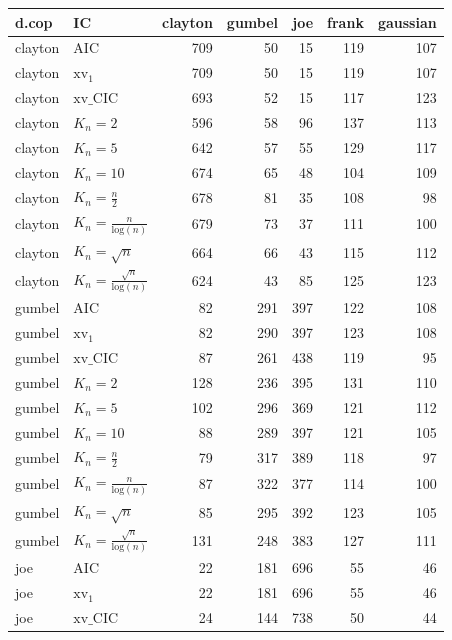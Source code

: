 \begin{table}[htbp]
\centering
\begin{tabular}{llrrrrr}
  \hline
d.cop & IC & clayton & gumbel & joe & frank & gaussian \\ 
  \hline
clayton & AIC & 709 & 50 & 15 & 119 & 107 \\ 
  clayton & $\text{xv}_{1}$ & 709 & 50 & 15 & 119 & 107 \\ 
  clayton & $\text{xv}\_\text{CIC}$ & 693 & 52 & 15 & 117 & 123 \\ 
  clayton & $K_{n}=2$ & 596 & 58 & 96 & 137 & 113 \\ 
  clayton & $K_{n}=5$ & 642 & 57 & 55 & 129 & 117 \\ 
  clayton & $K_{n}=10$ & 674 & 65 & 48 & 104 & 109 \\ 
  clayton & $K_{n}=\tfrac{n}{2}$ & 678 & 81 & 35 & 108 & 98 \\ 
  clayton & $K_{n}=\tfrac{n}{\text{log}(n)}$ & 679 & 73 & 37 & 111 & 100 \\ 
  clayton & $K_{n}=\sqrt{n}$ & 664 & 66 & 43 & 115 & 112 \\ 
  clayton & $K_{n}=\tfrac{\sqrt{n}}{\text{log}(n)}$ & 624 & 43 & 85 & 125 & 123 \\ 
   \hdashline
gumbel & AIC & 82 & 291 & 397 & 122 & 108 \\ 
  gumbel & $\text{xv}_{1}$ & 82 & 290 & 397 & 123 & 108 \\ 
  gumbel & $\text{xv}\_\text{CIC}$ & 87 & 261 & 438 & 119 & 95 \\ 
  gumbel & $K_{n}=2$ & 128 & 236 & 395 & 131 & 110 \\ 
  gumbel & $K_{n}=5$ & 102 & 296 & 369 & 121 & 112 \\ 
  gumbel & $K_{n}=10$ & 88 & 289 & 397 & 121 & 105 \\ 
  gumbel & $K_{n}=\tfrac{n}{2}$ & 79 & 317 & 389 & 118 & 97 \\ 
  gumbel & $K_{n}=\tfrac{n}{\text{log}(n)}$ & 87 & 322 & 377 & 114 & 100 \\ 
  gumbel & $K_{n}=\sqrt{n}$ & 85 & 295 & 392 & 123 & 105 \\ 
  gumbel & $K_{n}=\tfrac{\sqrt{n}}{\text{log}(n)}$ & 131 & 248 & 383 & 127 & 111 \\ 
   \hdashline
joe & AIC & 22 & 181 & 696 & 55 & 46 \\ 
  joe & $\text{xv}_{1}$ & 22 & 181 & 696 & 55 & 46 \\ 
  joe & $\text{xv}\_\text{CIC}$ & 24 & 144 & 738 & 50 & 44 \\ 

\end{tabular}
\end{table}
